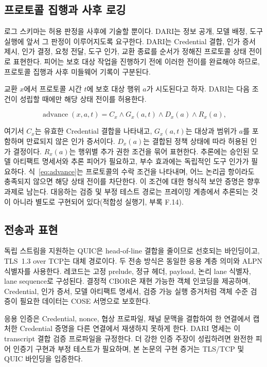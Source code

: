 \documentclass[10pt]{article}
\begin{document}
\subsection{프로토콜 집행과 사후 로깅}

로그 스키마는 허용 판정을 사후에 기술할 뿐이다. DARI는 정보 공개, 모델 배정, 도구 실행에 앞서 그 판정이 이루어지도록 요구한다. DARI는 Credential 결합, 인가 증서 제시, 인가 결정, 요청 전달, 도구 인가, 교환 종료를 순서가 정해진 프로토콜 상태 전이로 표현한다. 피어는 보호 대상 작업을 진행하기 전에 이러한 전이를 완료해야 하므로, 프로토콜 집행과 사후 미들웨어 기록이 구분된다.

교환 $x$에서 프로토콜 시간 $t$에 보호 대상 행위 $a$가 시도된다고 하자. DARI는 다음 조건이 성립할 때에만 해당 상태 전이를 허용한다.

\begin{equation}
\operatorname{advance}(x,a,t) = C_x \land G_x(a,t)
  \land D_x(a) \land R_x(a),
\label{eq:advance}
\end{equation}

여기서 $C_x$는 유효한 Credential 결합을 나타내고, $G_x(a,t)$는 대상과 범위가 $a$를 포함하며 만료되지 않은 인가 증서이다. $D_x(a)$는 결합된 정책 상태에 따라 허용된 인가 결정이다. $R_x(a)$는 행위별 추가 권한 조건을 묶어 표현한다. 추론에는 승인된 모델 아티팩트 명세서와 추론 피어가 필요하고, 부수 효과에는 독립적인 도구 인가가 필요하다. 식~\ref{eq:advance}는 프로토콜의 수락 조건을 나타내며, 어느 논리곱 항이라도 충족되지 않으면 해당 상태 전이를 차단한다. 이 조건에 대한 형식적 보안 증명은 향후 과제로 남는다. 대응하는 검증 및 부정 테스트 경로는 프레이밍 계층에서 추론되는 것이 아니라 별도로 구현되어 있다(적합성 실행기, 부록 F.14).

\subsection{전송과 표현}

독립 스트림을 지원하는 QUIC은 head-of-line 결합을 줄이므로 선호되는 바인딩이고, TLS~1.3 over TCP는 대체 경로이다. 두 전송 방식은 동일한 응용 계층 의미와 ALPN 식별자를 사용한다. 레코드는 고정 prelude, 정규 헤더, payload, 논리 lane 식별자, lane sequence로 구성된다. 결정적 CBOR은 재현 가능한 객체 인코딩을 제공하며, Credential, 인가 증서, 모델 아티팩트 명세서, 검증 가능 실행 증거처럼 객체 수준 검증이 필요한 데이터는 COSE 서명으로 보호한다.

응용 인증은 Credential, nonce, 협상 프로파일, 채널 문맥을 결합하여 한 연결에서 캡처한 Credential 증명을 다른 연결에서 재생하지 못하게 한다. DARI 명세는 이 transcript 결합 검증 프로파일을 규정한다. 더 강한 인증 주장이 성립하려면 완전한 피어 인증기 구현과 부정 테스트가 필요하며, 본 논문의 구현 증거는 TLS/TCP 및 QUIC 바인딩을 입증한다.
\end{document}
